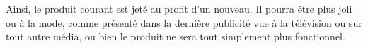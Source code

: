 Ainsi, le produit courant est jeté au profit d'un nouveau. Il pourra être plus joli ou à la mode, comme présenté dans la dernière publicité vue à la télévision ou sur tout autre média, ou bien le produit ne sera  tout simplement plus fonctionnel.


%
%
%
%
